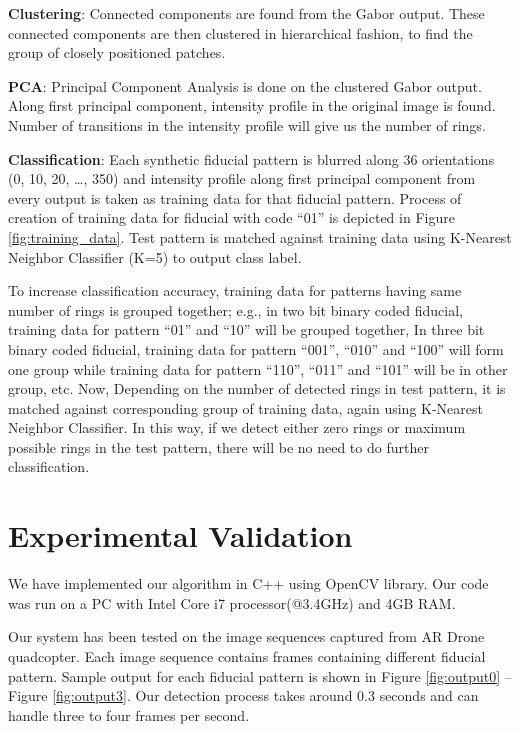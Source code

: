 \documentclass[runningheads]{llncs}
\begin{document}
\textbf{Clustering}: Connected components are found from the Gabor output.
These connected components are then clustered in hierarchical fashion, to find
the group of closely positioned patches.

\textbf{PCA}: Principal Component Analysis is done on the clustered Gabor
output. Along first principal component, intensity profile in the original image
is found. Number of transitions in the intensity profile will give us the
number of rings.

\textbf{Classification}: Each synthetic fiducial pattern is blurred along 36
orientations (0, 10, 20, \ldots , 350) and intensity profile along first
principal component from every output is taken as training data for that
fiducial pattern. Process of creation of training data for fiducial with
code ``01'' is depicted in Figure \ref{fig:training_data}. Test pattern is matched
against training data using K-Nearest Neighbor Classifier (K=5) to output class label.

To increase classification accuracy, training data for patterns having same
number of rings is grouped together; e.g., in two bit binary coded fiducial,
training data for pattern ``01'' and ``10'' will be grouped together, In three
bit binary coded fiducial, training data for pattern “001”, “010” and “100” will
form one group while training data for pattern “110”, “011” and “101” will be
in other group, etc. Now, Depending on the number of detected rings in test
pattern, it is matched against corresponding group of training data, again
using  K-Nearest Neighbor Classifier. In this way, if we detect either zero
rings or maximum possible rings in the test pattern, there will be no need to do
further classification.

\section{Experimental Validation}
We have implemented our algorithm in C++ using OpenCV library. Our code was run
on a PC with Intel Core i7 processor(@3.4GHz) and 4GB RAM.

Our system has been tested on the image sequences captured from AR Drone
quadcopter. Each image sequence contains frames containing different fiducial
pattern. Sample output for each fiducial pattern is shown in Figure
\ref{fig:output0} -- Figure \ref{fig:output3}. Our detection process takes
around 0.3 seconds and can handle three to four frames per second.
\end{document}
